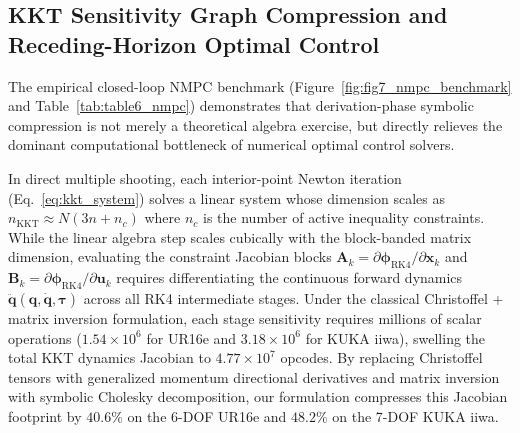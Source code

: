 \documentclass[fleqn,10pt]{article}
\begin{document}
	\subsection*{KKT Sensitivity Graph Compression and Receding-Horizon Optimal Control}
	
	The empirical closed-loop NMPC benchmark (Figure~\ref{fig:fig7_nmpc_benchmark} and Table~\ref{tab:table6_nmpc}) demonstrates that derivation-phase symbolic compression is not merely a theoretical algebra exercise, but directly relieves the dominant computational bottleneck of numerical optimal control solvers.
	
	In direct multiple shooting, each interior-point Newton iteration (Eq.~\eqref{eq:kkt_system}) solves a linear system whose dimension scales as $n_{\text{KKT}} \approx N(3n + n_c)$ where $n_c$ is the number of active inequality constraints. While the linear algebra step scales cubically with the block-banded matrix dimension, evaluating the constraint Jacobian blocks $\bm{A}_k = \partial \bm{\phi}_{\text{RK4}}/\partial \bm{x}_k$ and $\bm{B}_k = \partial \bm{\phi}_{\text{RK4}}/\partial \bm{u}_k$ requires differentiating the continuous forward dynamics $\ddot{\bm{q}}(\bm{q},\dot{\bm{q}},\bm{\tau})$ across all RK4 intermediate stages. Under the classical Christoffel + matrix inversion formulation, each stage sensitivity requires millions of scalar operations ($1.54 \times 10^6$ for UR16e and $3.18 \times 10^6$ for KUKA iiwa), swelling the total KKT dynamics Jacobian to $4.77 \times 10^7$ opcodes. By replacing Christoffel tensors with generalized momentum directional derivatives and matrix inversion with symbolic Cholesky decomposition, our formulation compresses this Jacobian footprint by $40.6\%$ on the 6-DOF UR16e and $48.2\%$ on the 7-DOF KUKA iiwa.
	
\end{document}
